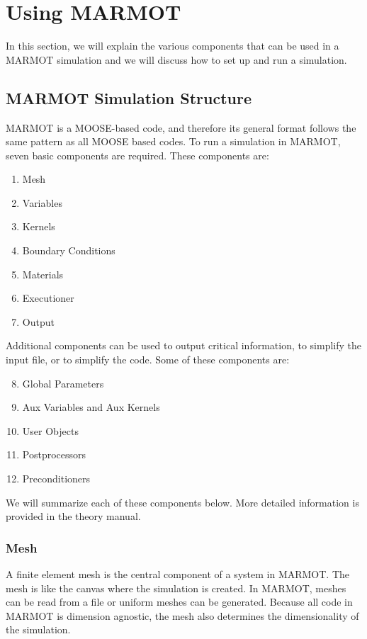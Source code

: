 \documentclass[letter,12pt,fleqn]{article}
\begin{document}
\section{Using MARMOT}
In this section, we will explain the various components that can be used in a MARMOT simulation and we will discuss how to set up and run a simulation.
\subsection{MARMOT Simulation Structure}

MARMOT is a MOOSE-based code, and therefore its general format follows the same pattern as all MOOSE based codes. To run a simulation in MARMOT, seven basic components are required. These components are:

\begin{enumerate}
  \item{Mesh}
  \item{Variables}
  \item{Kernels}
  \item{Boundary Conditions}
  \item{Materials}
  \item{Executioner}
  \item{Output}
\end{enumerate}

Additional components can be used to output critical information, to simplify the input file, or to simplify the code. Some of these components are:
\begin{enumerate}
  \setcounter{enumi}{7}
  \item{Global Parameters}
  \item{Aux Variables and Aux Kernels}
  \item{User Objects}
  \item{Postprocessors}
  \item{Preconditioners}
\end{enumerate}

We will summarize each of these components below. More detailed information is provided in the theory manual.

\subsubsection{Mesh}

A finite element mesh is the central component of a system in MARMOT. The mesh is like the canvas where the simulation is created.  In MARMOT, meshes can be read from a file or uniform meshes can be generated. Because all code in MARMOT is dimension agnostic, the mesh also determines the dimensionality of the simulation. 
\end{document}
